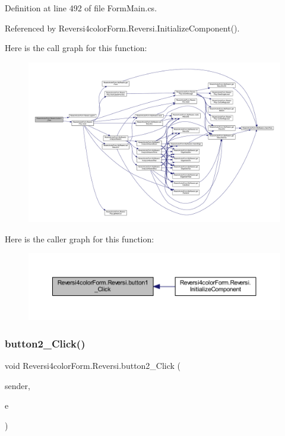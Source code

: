 Definition at line 492 of file Form\+Main.\+cs.



Referenced by Reversi4color\+Form.\+Reversi.\+Initialize\+Component().

Here is the call graph for this function\+:
\nopagebreak
\begin{figure}[H]
\begin{center}
\leavevmode
\includegraphics[width=350pt]{class_reversi4color_form_1_1_reversi_a6c7543d2823cf116c55bba3b970e4931_cgraph}
\end{center}
\end{figure}
Here is the caller graph for this function\+:
\nopagebreak
\begin{figure}[H]
\begin{center}
\leavevmode
\includegraphics[width=350pt]{class_reversi4color_form_1_1_reversi_a6c7543d2823cf116c55bba3b970e4931_icgraph}
\end{center}
\end{figure}
\mbox{\label{class_reversi4color_form_1_1_reversi_a99a5abaa127633df40da37167d579541}} 
\subsubsection{\texorpdfstring{button2\+\_\+\+Click()}{button2\_Click()}}
{\footnotesize\ttfamily void Reversi4color\+Form.\+Reversi.\+button2\+\_\+\+Click (\begin{DoxyParamCaption}\item[{object}]{sender,  }\item[{Event\+Args}]{e }\end{DoxyParamCaption})\hspace{0.3cm}{\ttfamily [private]}}



